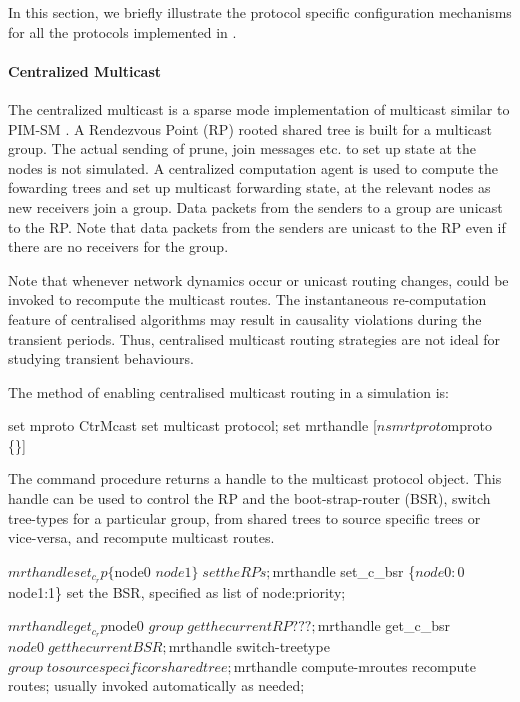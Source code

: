{In this section, we briefly illustrate the
protocol specific configuration mechanisms
for all the protocols implemented in \ns.

\paragraph{Centralized Multicast}
The centralized multicast is a sparse mode implementation of multicast
similar to PIM-SM \cite{Deer94a:Architecture}.
A Rendezvous Point (RP) rooted shared tree is built
for a multicast group.  The actual sending of prune, join messages
etc. to set up state at the nodes is not simulated.  A centralized
computation agent is used to compute the fowarding trees and set up
multicast forwarding state,  at the relevant nodes as new
receivers join a group.  Data packets from the senders to a group are
unicast to the RP.  Note that data packets from the senders are
unicast to the RP even if there are no receivers for the group.

Note that whenever network dynamics occur or unicast routing changes,
 could be invoked to recompute the multicast routes.
The instantaneous re-computation feature of centralised algorithms
may result in causality violations during the transient
periods.  Thus, centralised multicast routing strategies are not
ideal for studying transient behaviours.

The method of enabling centralised multicast routing in a simulation is:
\begin{program}
	set mproto CtrMcast    \; set multicast protocol;
	set mrthandle [$ns mrtproto $mproto \{\}]
\end{program}
The command procedure 
returns a handle to the multicast protocol object.
This handle can be used to control the RP and the boot-strap-router (BSR),
switch tree-types for a particular group,
from shared trees to source specific trees or vice-versa, and
recompute multicast routes.
\begin{program}
	$mrthandle set_c_rp \{$node0 $node1\}      \; set the RPs;
	$mrthandle set_c_bsr \{$node0:0 $node1:1\} \; set the BSR, specified as list of node:priority;

	$mrthandle get_c_rp $node0 $group          \; get the current RP ???;
	$mrthandle get_c_bsr $node0                \; get the current BSR;

	$mrthandle switch-treetype $group         \; to source specific or shared tree;

	$mrthandle compute-mroutes       \; recompute routes; usually invoked automatically as needed;
\end{program}

}
